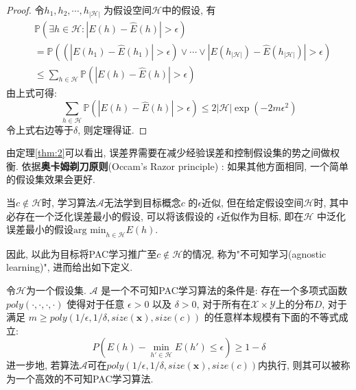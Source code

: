 \begin{proof}
 令$h_1,h_2,\cdots,h_{\left| \mathcal{H} \right|}$ 为假设空间$\mathcal{H}$中的假设, 有
\begin{equation}
\begin{aligned}
&\mathbb{P}\left( \exists h\in \mathcal{H}:\left| E\left( h \right) -\hat{E}\left( h \right) \right|>\epsilon \right) \\
&=\mathbb{P}\left( \left( \left| E\left( h_1 \right) -\hat{E}\left( h_1 \right) \right|>\epsilon \right) \lor \cdots \lor \left| E\left( h_{\left| \mathcal{H} \right|} \right) -\hat{E}\left( h_{\left| \mathcal{H} \right|} \right) \right|>\epsilon \right) \\
&\le \sum_{h\in \mathcal{H}}{\mathbb{P}\left( \left| E\left( h \right) -\hat{E}\left( h \right) \right|>\epsilon \right)} \nonumber
\end{aligned}
\end{equation}
由上式可得:
\begin{equation}
\sum_{h\in \mathcal{H}}{\mathbb{P}\left( \left| E\left( h \right) -\hat{E}\left( h \right) \right|>\epsilon \right)}\le 2\left| \mathcal{H} \right|\exp \left( -2m\epsilon ^2 \right)
\end{equation}
令上式右边等于$\delta$, 则定理得证.
\end{proof}

由定理\ref{thm:2}可以看出, 误差界需要在减少经验误差和控制假设集的势之间做权衡. 依据\textbf{奥卡姆剃刀原则}(Occam's Razor principle) :  如果其他方面相同, 一个简单的假设集效果会更好.

当$c\notin \mathcal{H}$时, 学习算法$\mathcal{A}$无法学到目标概念$c$ 的$\epsilon$近似, 但在给定假设空间$\mathcal{H}$时, 其中必存在一个泛化误差最小的假设, 可以将该假设的 $\epsilon$近似作为目标, 即在$\mathcal{H}$ 中泛化误差最小的假设$\textrm{arg\ min}_{h\in\mathcal{H} }E(h)$.

因此, 以此为目标将PAC学习推广至$c\notin \mathcal{H}$的情况, 称为"不可知学习(agnostic learning)", 进而给出如下定义. 


\begin{definition}[不可知PAC学习]
令$\mathcal{H}$为一个假设集. $\mathcal{A}$ 是一个不可知PAC学习算法的条件是: 存在一个多项式函数 $poly(\cdot,\cdot,\cdot,\cdot)$ 使得对于任意 $\epsilon>0$ 以及 $\delta > 0$, 对于所有在$\mathcal{X}\times\mathcal{Y} $上的分布$D$, 对于满足 $m\ge poly(1/\epsilon,1/\delta,size(\mathbf{x}),size(c))$ 的任意样本规模有下面的不等式成立:
\begin{equation}
P\left( E\left( h \right) -\min_{h'\in \mathcal{H}}E\left( h' \right) \le \epsilon \right) \ge 1-\delta
\end{equation}
进一步地, 若算法$\mathcal{A}$可在$poly(1/\epsilon,1/\delta,size(\mathbf{x}),size(c))$内执行, 则其可以被称为一个高效的不可知PAC学习算法.
\end{definition}


